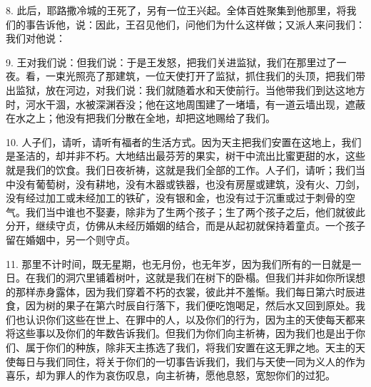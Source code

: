 8. 此后，耶路撒冷城的王死了，另有一位王兴起。全体百姓聚集到他那里，将我们的事告诉他，说：因此，王召见他们，问他们为什么这样做；又派人来问我们：我们对他说：\par

9. 王对我们说：但我们说：于是王发怒，把我们关进监狱，我们在那里过了一夜。看，一束光照亮了那建筑，一位天使打开了监狱，抓住我们的头顶，把我们带出监狱，放在河边，对我们说：我们就随着水和天使前行。当他带我们到达这地方时，河水干涸，水被深渊吞没；他在这地周围建了一堵墙，有一道云墙出现，遮蔽在水之上；他没有把我们分散在全地，却把这地赐给了我们。\par

10. 人子们，请听，请听有福者的生活方式。因为天主把我们安置在这地上，我们是圣洁的，却并非不朽。大地结出最芬芳的果实，树干中流出比蜜更甜的水，这些就是我们的饮食。我们日夜祈祷，这就是我们全部的工作。人子们，请听；我们当中没有葡萄树，没有耕地，没有木器或铁器，也没有房屋或建筑，没有火、刀剑，没有经过加工或未经加工的铁矿，没有银和金，也没有过于沉重或过于刺骨的空气。我们当中谁也不娶妻，除非为了生两个孩子；生了两个孩子之后，他们就彼此分开，继续守贞，仿佛从未经历婚姻的结合，而是从起初就保持着童贞。一个孩子留在婚姻中，另一个则守贞。\par

11. 那里不计时间，既无星期，也无月份，也无年岁，因为我们所有的一日就是一日。在我们的洞穴里铺着树叶，这就是我们在树下的卧榻。但我们并非如你所误想的那样赤身露体，因为我们穿着不朽的衣裳，彼此并不羞惭。我们每日第六时辰进食，因为树的果子在第六时辰自行落下，我们便吃饱喝足，然后水又回到原处。我们也认识你们这些在世上、在罪中的人，以及你们的行为，因为主的天使每天都来将这些事以及你们的年数告诉我们。但我们为你们向主祈祷，因为我们也是出于你们、属于你们的种族，除非天主拣选了我们，将我们安置在这无罪之地。天主的天使每日与我们同住，将关于你们的一切事告诉我们，我们与天使一同为义人的作为喜乐，却为罪人的作为哀伤叹息，向主祈祷，愿他息怒，宽恕你们的过犯。\par

